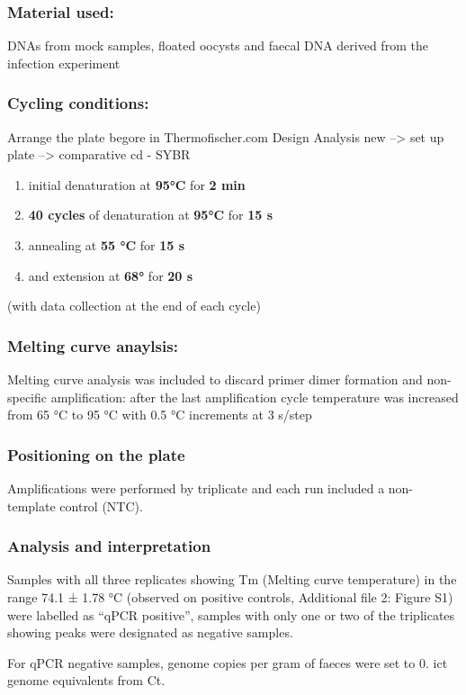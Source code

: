 \documentclass[
]{article}
\providecommand{\tightlist}{%
  \setlength{\itemsep}{0pt}\setlength{\parskip}{0pt}}
\begin{document}
\hypertarget{material-used}{%
\subsubsection{Material used:}\label{material-used}}

DNAs from mock samples, floated oocysts and faecal DNA derived from the
infection experiment

\hypertarget{cycling-conditions}{%
\subsubsection{Cycling conditions:}\label{cycling-conditions}}

Arrange the plate begore in Thermofischer.com Design Analysis new
--\textgreater{} set up plate --\textgreater{} comparative cd - SYBR

\begin{enumerate}
\def\labelenumi{\arabic{enumi}.}
\tightlist
\item
  initial denaturation at \textbf{95°C} for \textbf{2 min}
\item
  \textbf{40 cycles} of denaturation at \textbf{95°C} for \textbf{15 s}
\item
  annealing at \textbf{55 °C} for \textbf{15 s}
\item
  and extension at \textbf{68°} for \textbf{20 s}
\end{enumerate}

(with data collection at the end of each cycle)

\hypertarget{melting-curve-anaylsis}{%
\subsubsection{Melting curve anaylsis:}\label{melting-curve-anaylsis}}

Melting curve analysis was included to discard primer dimer formation
and non-specific amplification: after the last amplification cycle
temperature was increased from 65 °C to 95 °C with 0.5 °C increments at
3 s/step

\hypertarget{positioning-on-the-plate}{%
\subsubsection{Positioning on the
plate}\label{positioning-on-the-plate}}

Amplifications were performed by triplicate and each run included a
non-template control (NTC).

\hypertarget{analysis-and-interpretation}{%
\subsubsection{Analysis and
interpretation}\label{analysis-and-interpretation}}

Samples with all three replicates showing Tm (Melting curve temperature)
in the range 74.1 ± 1.78 °C (observed on positive controls, Additional
file 2: Figure S1) were labelled as ``qPCR positive'', samples with only
one or two of the triplicates showing peaks were designated as negative
samples.

For qPCR negative samples, genome copies per gram of faeces were set to
0. ict genome equivalents from Ct.
\end{document}

